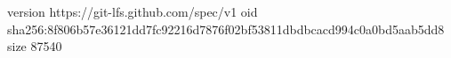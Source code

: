 version https://git-lfs.github.com/spec/v1
oid sha256:8f806b57e36121dd7fc92216d7876f02bf53811dbdbcacd994c0a0bd5aab5dd8
size 87540
